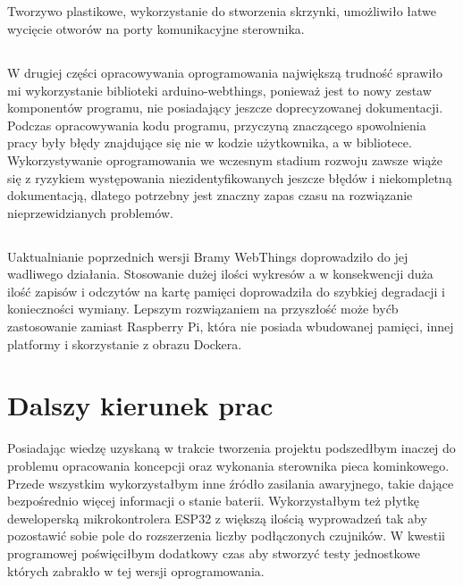 \documentclass[11pt]{report}
\begin{document}
\section{}
Tworzywo plastikowe, wykorzystanie do stworzenia skrzynki, umożliwiło łatwe wycięcie otworów na porty komunikacyjne sterownika.
\section{}
W drugiej części opracowywania oprogramowania największą trudność sprawiło mi wykorzystanie biblioteki arduino-webthings, ponieważ jest to nowy zestaw komponentów programu, nie posiadający jeszcze doprecyzowanej dokumentacji. Podczas opracowywania kodu programu, przyczyną znaczącego spowolnienia pracy były błędy znajdujące się nie w kodzie użytkownika, a w bibliotece.
Wykorzystywanie oprogramowania we wczesnym stadium rozwoju zawsze wiąże się z ryzykiem występowania niezidentyfikowanych jeszcze błędów i niekompletną dokumentacją, dlatego potrzebny jest znaczny zapas czasu na rozwiązanie nieprzewidzianych problemów.
\section{}
Uaktualnianie poprzednich wersji Bramy WebThings doprowadziło do jej wadliwego działania.
Stosowanie dużej ilości wykresów a w konsekwencji duża ilość zapisów i odczytów na kartę pamięci doprowadziła do szybkiej degradacji i konieczności wymiany.
Lepszym rozwiązaniem na przyszłość może byćb zastosowanie zamiast Raspberry Pi, która nie posiada wbudowanej pamięci, innej platformy i skorzystanie z obrazu Dockera.
 
 \chapter{Dalszy kierunek prac}
Posiadając wiedzę uzyskaną w trakcie tworzenia projektu podszedłbym inaczej do problemu opracowania koncepcji oraz wykonania sterownika pieca kominkowego. Przede wszystkim wykorzystałbym inne źródło zasilania awaryjnego, takie dające bezpośrednio więcej informacji o stanie baterii. Wykorzystałbym też płytkę deweloperską mikrokontrolera ESP32 z większą ilością wyprowadzeń tak aby pozostawić sobie pole do rozszerzenia liczby podłączonych czujników. W kwestii programowej poświęciłbym dodatkowy czas aby stworzyć testy jednostkowe których zabrakło w tej wersji oprogramowania.
\end{document}
